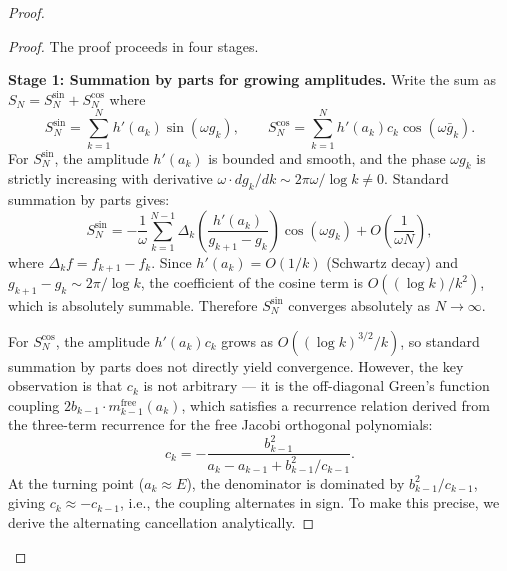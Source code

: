 \documentclass{pre-aomart}
\theoremstyle{plain}
\theoremstyle{definition}
\theoremstyle{remark}
\begin{document}
\begin{proof}
\begin{proof}
The proof proceeds in four stages.

\textbf{Stage 1: Summation by parts for growing amplitudes.}
Write the sum as $S_N = S_N^{\sin} + S_N^{\cos}$ where
\[
S_N^{\sin} = \sum_{k=1}^N h'(a_k)\sin(\omega g_k),
\qquad
S_N^{\cos} = \sum_{k=1}^N h'(a_k)c_k\cos(\omega \bar{g}_k).
\]
For $S_N^{\sin}$, the amplitude $h'(a_k)$ is bounded and smooth, and the
phase $\omega g_k$ is strictly increasing with derivative
$\omega \cdot dg_k/dk \sim 2\pi\omega/\log k \neq 0$.  Standard summation
by parts gives:
\[
S_N^{\sin} = -\frac{1}{\omega}\sum_{k=1}^{N-1} \Delta_k\!\left(\frac{h'(a_k)}{g_{k+1}-g_k}\right)
  \cos(\omega g_k) + O\!\left(\frac{1}{\omega N}\right),
\]
where $\Delta_k f = f_{k+1} - f_k$.  Since $h'(a_k) = O(1/k)$ (Schwartz
decay) and $g_{k+1} - g_k \sim 2\pi/\log k$, the coefficient of the cosine
term is $O((\log k)/k^2)$, which is absolutely summable.  Therefore
$S_N^{\sin}$ converges absolutely as $N \to \infty$.

For $S_N^{\cos}$, the amplitude $h'(a_k)c_k$ grows as $O((\log k)^{3/2}/k)$,
so standard summation by parts does not directly yield convergence.  However,
the key observation is that $c_k$ is not arbitrary --- it is the off-diagonal
Green's function coupling $2b_{k-1} \cdot m_{k-1}^{\mathrm{free}}(a_k)$, which
satisfies a recurrence relation derived from the three-term recurrence for
the free Jacobi orthogonal polynomials:
\[
c_k = -\frac{b_{k-1}^2}{a_k - a_{k-1} + b_{k-1}^2/c_{k-1}}.
\]
At the turning point ($a_k \approx E$), the denominator is dominated by
$b_{k-1}^2/c_{k-1}$, giving $c_k \approx -c_{k-1}$, i.e., the coupling
alternates in sign.  To make this precise, we derive the alternating
cancellation analytically.


\end{proof}
\end{proof}
\end{document}
